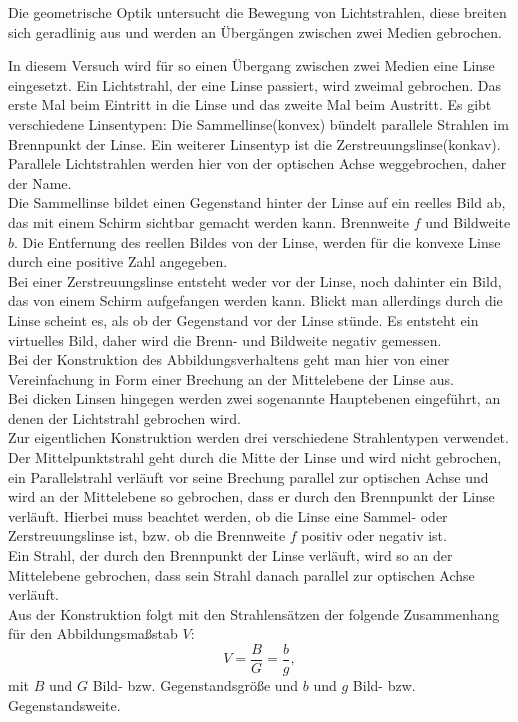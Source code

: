 Die geometrische Optik untersucht die Bewegung von Lichtstrahlen, diese breiten sich geradlinig aus und werden an Übergängen zwischen zwei Medien gebrochen.

In diesem Versuch wird für so einen Übergang zwischen zwei Medien eine Linse eingesetzt. Ein Lichtstrahl, der eine Linse
passiert, wird zweimal gebrochen. Das erste Mal beim Eintritt in
die Linse und das zweite Mal beim Austritt.  Es gibt verschiedene
Linsentypen:  Die Sammellinse(konvex) bündelt parallele Strahlen im Brennpunkt der Linse. Ein weiterer Linsentyp ist die
Zerstreuungslinse(konkav). Parallele Lichtstrahlen werden hier von der optischen Achse weggebrochen, daher der Name.\\

Die Sammellinse bildet einen Gegenstand hinter der Linse auf ein reelles Bild ab, das mit einem Schirm sichtbar gemacht werden kann. Brennweite $f$ und Bildweite $b$. Die Entfernung des reellen Bildes von der Linse, werden für die konvexe Linse durch eine positive Zahl angegeben.\\
Bei einer Zerstreuungslinse entsteht weder vor der Linse, noch dahinter ein
Bild, das von einem Schirm aufgefangen werden kann. Blickt man
allerdings durch die Linse scheint es, als ob der Gegenstand vor der
Linse stünde. Es entsteht ein virtuelles Bild, daher wird die Brenn- und Bildweite negativ gemessen.\\

Bei der Konstruktion des Abbildungsverhaltens geht man hier von einer Vereinfachung in Form einer Brechung an der Mittelebene der Linse aus.\\
Bei dicken Linsen hingegen werden zwei sogenannte
Hauptebenen eingeführt, an denen der Lichtstrahl gebrochen wird.\\
Zur eigentlichen Konstruktion werden drei verschiedene Strahlentypen
verwendet. Der Mittelpunktstrahl geht durch die Mitte der Linse und
wird nicht gebrochen, ein Parallelstrahl verläuft vor seine Brechung
parallel zur optischen Achse und wird an der Mittelebene so gebrochen,
dass er durch den Brennpunkt der Linse verläuft. Hierbei muss beachtet
werden, ob die Linse eine Sammel- oder Zerstreuungslinse ist, bzw. ob
die Brennweite $f$ positiv oder negativ ist.\\
Ein Strahl, der durch den Brennpunkt der Linse verläuft, wird so an der Mittelebene gebrochen, dass sein Strahl danach parallel zur optischen Achse verläuft.\\

Aus der Konstruktion folgt mit den Strahlensätzen der folgende
Zusammenhang für den Abbildungsmaßstab $V$:
%
\begin{equation}
  V = \frac{B}{G} = \frac{b}{g},
\end{equation}
%
mit $B$ und $G$ Bild- bzw. Gegenstandsgröße und $b$ und
$g$ Bild- bzw. Gegenstandsweite.\\

